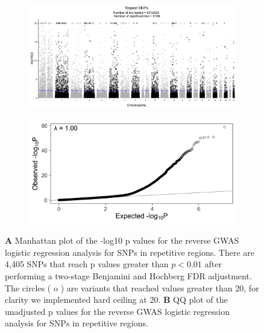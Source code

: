 \documentclass[custompaper]{MBE}%
\begin{document}
\begin{figure} \centering
    \begin{subfigure}[b]{\linewidth}
        \includegraphics[width=\hsize]{./Figures/ManhattanPlot_RepeatSNPs.jpg}
        \label{fig:a}
    \end{subfigure} %

    \begin{subfigure}[b]{\linewidth}
    	\center    
        \includegraphics[width=\hsize]{./Figures/QQPlot_RepeatSNPs.jpg}
        \label{fig:b}    
    \end{subfigure} 
    \caption{\textbf{A} Manhattan plot of the -log10 p values for the reverse GWAS logistic regression analysis for SNPs in repetitive regions. There are 4,405 SNPs that reach p values greater than $ p < 0.01$ after performing a two-stage Benjamini and Hochberg FDR adjustment.  The circles ( o ) are variants that reached values greater than 20, for clarity we implemented hard ceiling at 20. 
  \textbf{B} QQ plot of the unadjusted p values for the reverse GWAS logistic regression analysis for SNPs in repetitive regions.}
  \label{RS_Manhattan}
  \end{figure}
  
\end{document}
